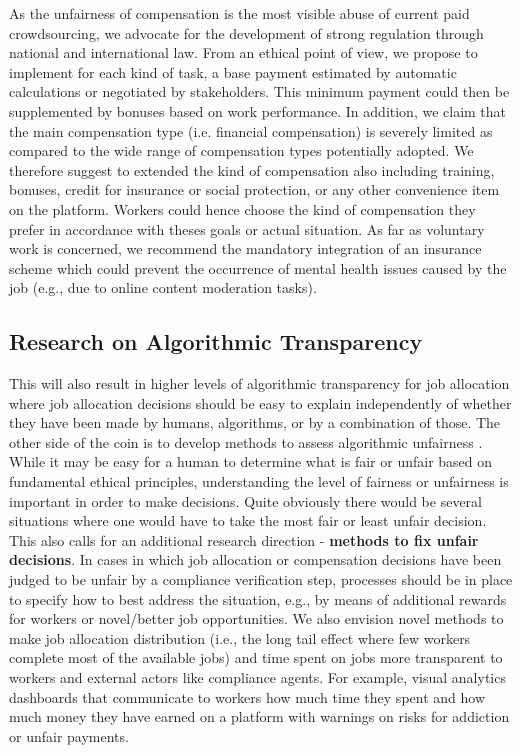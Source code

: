 \documentclass[11pt]{article}
\begin{document}
As the unfairness of compensation is the most visible abuse of current paid crowdsourcing, we advocate for the development of strong regulation through national and international law. From an ethical point of view, we propose to implement for each kind of task, a base payment estimated by automatic calculations or negotiated by stakeholders. This minimum payment could then be supplemented by bonuses based on work performance. In addition, we claim that the main compensation type (i.e. financial compensation) is severely limited as compared to the wide range of compensation types potentially adopted. We therefore suggest to extended the kind of compensation also including training, bonuses, credit for insurance or social protection, or any other convenience item on the platform. Workers could hence choose the kind of compensation they prefer in accordance with theses goals or actual situation. 
As far as voluntary work is concerned, we recommend the mandatory integration of an insurance scheme which could prevent the occurrence of mental health issues caused by the job (e.g., due to online content moderation tasks). 


\subsection{Research on Algorithmic Transparency}
This will also result in higher levels of algorithmic transparency for job allocation where job allocation decisions should be easy to explain independently of whether they have been made by humans, algorithms, or by a combination of those.
% 
The other side of the coin is to develop methods to assess algorithmic unfairness \cite{speicher2018unified}. While it may be easy for a human to determine what is fair or unfair based on fundamental ethical principles, understanding the level of fairness or unfairness is important in order to make decisions. Quite obviously there would be several situations where one would have to take the most fair or least unfair decision. 
This also calls for an additional research direction - \textbf{methods to fix unfair decisions}. In cases in which job allocation or compensation decisions have been judged to be unfair by a compliance verification step, processes should be in place to specify how to best address the situation, e.g., by means of additional rewards for workers or novel/better job opportunities.
% 
We also envision novel methods to make job allocation distribution (i.e., the long tail effect where few workers complete most of the available jobs) and time spent on jobs more transparent to workers and external actors like compliance agents. For example, visual analytics dashboards that communicate to workers how much time they spent and how much money they have earned on a platform with warnings on risks for addiction or unfair payments.
\end{document}
